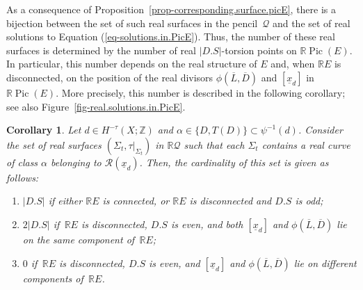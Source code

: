 \documentclass[11pt]{amsart}
\numberwithin{equation}{section}
\theoremstyle{definition}
\theoremstyle{plain}
\newtheorem{corollary}[definition]{Corollary}
\theoremstyle{remark}
\newcommand{\R}{\mathbb{R}}
\DeclareMathOperator{\Pic}{Pic}
\begin{document}
As a consequence of Proposition~\ref{prop-corresponding.surface.picE}, there is a bijection between the set of such real surfaces in the pencil~$\mathcal{Q}$ and the set of real solutions to Equation (\ref{eq-solutions.in.PicE}). Thus, the number of these real surfaces is determined by the number of real $|D.S|$-torsion points on $\R \Pic(E)$. In particular, this number depends on the real structure of  $E$ and, when $\R E$ is disconnected, on the position of the real divisors  $\phi(\overline{L},\overline{D})$ and $[\underline{x}_d]$ in $\R \Pic(E)$. More precisely, this number is described in the following corollary; see also Figure~\ref{fig-real.solutions.in.PicE}.


\begin{corollary}\label{coro-degree.case.real}
Let $d \in H^{-\tau}(X;\mathbb{Z})$ and $\alpha \in \{D, T(D)\} \subset \psi^{-1}(d)$. Consider the set of real surfaces $(\Sigma_t, \tau|_{\Sigma_t})$ in $\mathbb{R} \mathcal{Q}$ such that each $\Sigma_t$ contains a real curve of class $\alpha$ belonging to $\mathcal{R}(\underline{x}_d)$. Then, the cardinality of this set is given as follows:
\begin{enumerate}[label={\rm(\alph*)}, ref={\rm\alph*}]
         \item $|D.S|$ if either $\R E$ is connected, or $\R E$ is disconnected and $D.S$ is odd;
      \item $2|D.S|$ if\, $\R E$ is disconnected, $D.S$ is even, and      both $[\underline{x}_d]$ and $\phi(\overline{L},\overline{D})$ lie on the same component of\, $\R E$; 
      \item\label{c-d.c.r-c} $0$ if\, $\R E$ is disconnected, $D.S$ is even, and $[\underline{x}_d]$ and $\phi(\overline{L},\overline{D})$ lie on different components of\, $\R E$. 
  \end{enumerate}
  \end{corollary}
  
\end{document}
